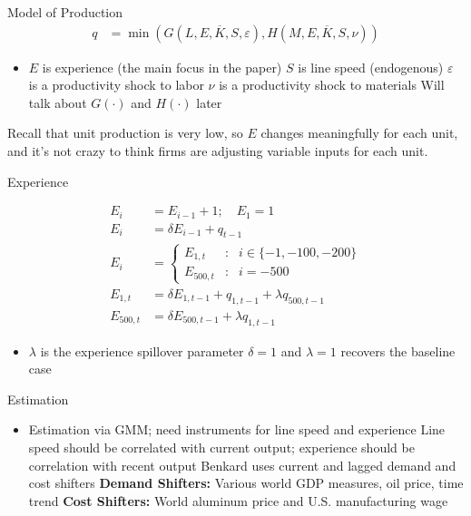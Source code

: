 \documentclass[dvipsnames]{beamer}
\begin{document}
%
\begin{frame}{Model of Production}
  \vspace{-2em}
  \begin{align*}
    q &= \min (G(L, E, \overline{K}, S, \varepsilon),
        H(M, E, \overline{K}, S, \nu )) \tag{Leontief} 
  \end{align*}
  \vspace{-1em}
  \begin{itemize}
  \item $E$ is experience (the main focus in the paper)
    \vitem $S$ is line speed (endogenous)
    \vitem $\varepsilon$ is a productivity shock to labor
    \vitem $\nu$ is a productivity shock to materials
    \vitem Will talk about $G(\cdot)$ and $H(\cdot)$ later
  \end{itemize}
  \vfill
  Recall that unit production is very low, so $E$ changes meaningfully for each unit, and it's not crazy to think firms are adjusting variable inputs for each unit.
\end{frame}
%
\begin{frame}{Experience}
\begin{fleqn}[0pt]
  \begin{align*}
    E_i &= E_{i - 1} + 1; \quad E_{1} = 1 \tag{baseline}\\[2em]
    E_i &= \delta E_{i - 1} + q_{t - 1} \tag{with forgetting}\\[2em]
    E_i &= \left\{
          \begin{array}{lcl}
            E_{1, t}& : & i \in \{-1, -100, -200\}\\
            E_{500, t} & : & i = -500
          \end{array}\right. \tag{inc. spillovers}\\[1em]
    E_{1, t} &= \delta E_{1, t - 1} + q_{1, t - 1} + \lambda q_{500, t - 1}\\
    E_{500, t} &= \delta E_{500, t - 1} + \lambda q_{1, t - 1}
  \end{align*}
  \end{fleqn}
  \begin{itemize}
  \item $\lambda$ is the experience spillover parameter
    \vitem $\delta = 1$ and $\lambda =1$ recovers the baseline case
  \end{itemize}
\end{frame}
%
\begin{frame}{Estimation}
  \begin{itemize}
  \item Estimation via GMM; need instruments for line speed and experience
   \vitem Line speed should be correlated with current output; experience should be correlation with recent output 
   \vitem Benkard uses current and lagged demand and cost shifters
   \vitem \textbf{Demand Shifters:} Various world GDP measures, oil price, time trend
   \vitem \textbf{Cost Shifters:} World aluminum price and U.S. manufacturing wage
  \end{itemize}
\end{frame}
\end{document}
